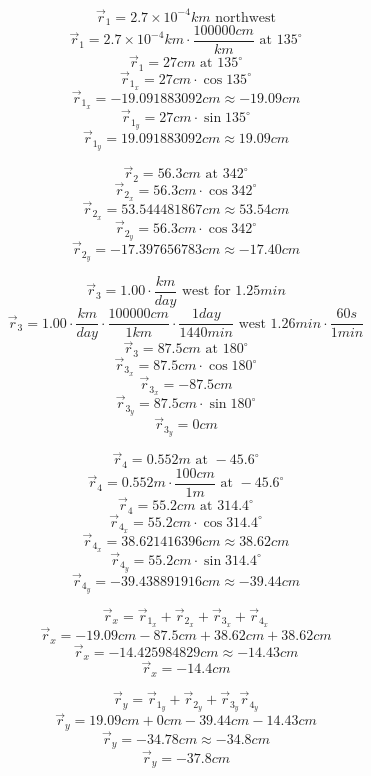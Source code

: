 \documentclass[11pt, letterpaper, includehead]{article}
\begin{document}
\begin{multicols}{2}
  $$\vec{r}_1 = 2.7\times10^{-4}km \text{ northwest}$$
  $$\vec{r}_1 = 2.7\times10^{-4}km \cdot\frac{100000cm}{km}\text{ at }135^{\circ}$$
  $$\vec{r}_1 = 27cm \text{ at }135^{\circ}$$
  $$\vec{r}_{1_x} = 27cm\cdot\cos135^{\circ}$$
  $$\vec{r}_{1_x} = -19.091883092cm \approx -19.09cm$$
  $$\vec{r}_{1_y} = 27cm\cdot\sin135^{\circ}$$
  $$\vec{r}_{1_y} = 19.091883092cm \approx 19.09cm$$

  \columnbreak
  $$\vec{r}_2 = 56.3cm \text{ at } 342^{\circ}$$
  $$\vec{r}_{2_x} = 56.3cm\cdot\cos342^{\circ}$$
  $$\vec{r}_{2_x} = 53.544481867cm \approx 53.54cm$$
  $$\vec{r}_{2_y} = 56.3cm\cdot\cos342^{\circ}$$
  $$\vec{r}_{2_y} = -17.397656783cm \approx -17.40cm$$
\end{multicols}

\hspace{0.5cm}

\begin{multicols}{2}
  $$\vec{r}_3 = 1.00\cdot\frac{km}{day} \text{ west for }1.25min$$
  $$\vec{r}_3 = 1.00\cdot\frac{km}{day}\cdot\frac{100000cm}{1km}\cdot\frac{1day}{1440min}\text{ west }1.26min\cdot\frac{60s}{1min}$$
  $$\vec{r}_3 = 87.5cm\text{ at }180^{\circ}$$
  $$\vec{r}_{3_x} = 87.5cm\cdot\cos180^{\circ}$$
  $$\vec{r}_{3_x} = -87.5cm$$
  $$\vec{r}_{3_y} = 87.5cm\cdot\sin180^{\circ}$$
  $$\vec{r}_{3_y} = 0cm$$

  \columnbreak
  $$\vec{r}_4 = 0.552m \text{ at } -45.6^{\circ}$$
  $$\vec{r}_4 = 0.552m\cdot\frac{100cm}{1m} \text{ at } -45.6^{\circ}$$
  $$\vec{r}_4 = 55.2cm \text{ at } 314.4^{\circ}$$
  $$\vec{r}_{4_x} = 55.2cm\cdot\cos314.4^{\circ}$$
  $$\vec{r}_{4_x} = 38.621416396cm \approx 38.62cm$$
  $$\vec{r}_{4_y} = 55.2cm\cdot\sin314.4^{\circ}$$
  $$\vec{r}_{4_y} = -39.438891916cm \approx -39.44cm$$
\end{multicols}

\hspace{0.5cm}

\begin{multicols}{2}
  $$\vec{r}_x = \vec{r}_{1_x} + \vec{r}_{2_x} + \vec{r}_{3_x} + \vec{r}_{4_x}$$
  $$\vec{r}_x = -19.09cm -87.5cm + 38.62cm + 38.62cm$$
  $$\vec{r}_x = -14.425984829cm \approx -14.43cm$$
  $$\boxed{\vec{r}_x = -14.4cm}$$
  
  \columnbreak
  $$\vec{r}_y = \vec{r}_{1_y} + \vec{r}_{2_y} + \vec{r}_{3_y} \vec{r}_{4_y}$$
  $$\vec{r}_y = 19.09cm + 0cm -39.44cm -14.43cm$$
  $$\vec{r}_y= -34.78cm \approx -34.8cm$$
  $$\boxed{\vec{r}_y = -37.8cm}$$
\end{multicols}
\end{document}
